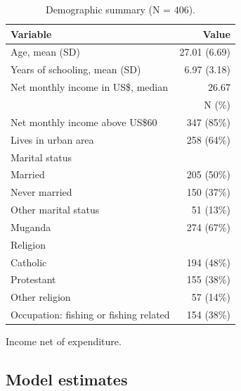\documentclass[11pt]{article}
\numberwithin{equation}{section}\numberwithin{figure}{section}\numberwithin{table}{section}
\begin{document}
\begin{table}[!htbp]
\centering
\caption{Demographic summary (N = 406).}\label{tab:demographics}
\small
\begin{threeparttable}
\begin{tabular}{lr}
\toprule
Variable & Value \\
\midrule
Age, mean (SD) & 27.01 (6.69) \\
Years of schooling, mean (SD) & 6.97 (3.18) \\
Net monthly income in US\$, median\tnote{a} & 26.67 \\
 & N (\%) \\
Net monthly income above US\$60\tnote{a} & 347 (85\%) \\
Lives in urban area & 258 (64\%) \\
Marital status & \\
\hspace{1em}Married & 205 (50\%) \\
\hspace{1em}Never married & 150 (37\%) \\
\hspace{1em}Other marital status & 51 (13\%) \\
Muganda & 274 (67\%) \\
Religion & \\
\hspace{1em}Catholic & 194 (48\%) \\
\hspace{1em}Protestant & 155 (38\%) \\
\hspace{1em}Other religion & 57 (14\%) \\
Occupation: fishing or fishing related & 154 (38\%) \\
\bottomrule
\end{tabular}
\begin{tablenotes}\footnotesize
\item[a] Income net of expenditure.
\end{tablenotes}
\end{threeparttable}
\end{table}

\subsection{Model estimates}
\end{document}
